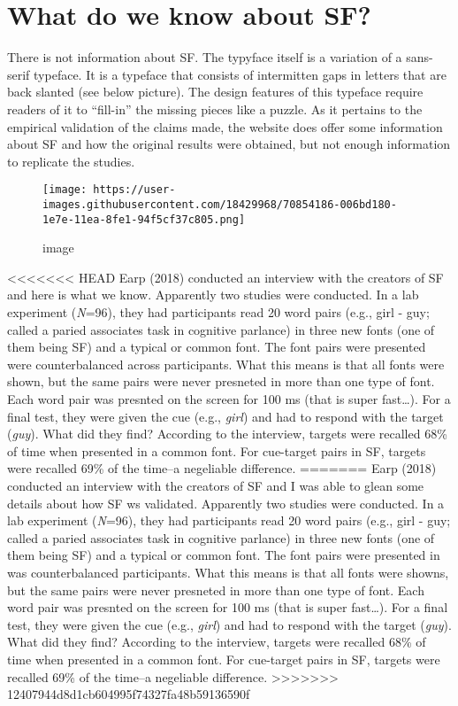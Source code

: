 \documentclass[]{article}
\begin{document}
\hypertarget{what-do-we-know-about-sf}{%
\section{What do we know about SF?}\label{what-do-we-know-about-sf}}

There is not information about SF. The typyface itself is a variation of
a sans-serif typeface. It is a typeface that consists of intermitten
gaps in letters that are back slanted (see below picture). The design
features of this typeface require readers of it to ``fill-in'' the
missing pieces like a puzzle. As it pertains to the empirical validation
of the claims made, the website does offer some information about SF and
how the original results were obtained, but not enough information to
replicate the studies.

\begin{figure}
\centering
\texttt{[image: https://user-images.githubusercontent.com/18429968/70854186-006bd180-1e7e-11ea-8fe1-94f5cf37c805.png]}
\caption{image}
\end{figure}

\textless{}\textless{}\textless{}\textless{}\textless{}\textless{}\textless{}
HEAD Earp (2018) conducted an interview with the creators of SF and here
is what we know. Apparently two studies were conducted. In a lab
experiment (\emph{N}=96), they had participants read 20 word pairs
(e.g., girl - guy; called a paried associates task in cognitive
parlance) in three new fonts (one of them being SF) and a typical or
common font. The font pairs were presented were counterbalanced across
participants. What this means is that all fonts were shown, but the same
pairs were never presneted in more than one type of font. Each word pair
was presnted on the screen for 100 ms (that is super fast\ldots{}). For
a final test, they were given the cue (e.g., \emph{girl}) and had to
respond with the target (\emph{guy}). What did they find? According to
the interview, targets were recalled 68\% of time when presented in a
common font. For cue-target pairs in SF, targets were recalled 69\% of
the time--a negeliable difference. ======= Earp (2018) conducted an
interview with the creators of SF and I was able to glean some details
about how SF ws validated. Apparently two studies were conducted. In a
lab experiment (\emph{N}=96), they had participants read 20 word pairs
(e.g., girl - guy; called a paried associates task in cognitive
parlance) in three new fonts (one of them being SF) and a typical or
common font. The font pairs were presented in was counterbalanced
participants. What this means is that all fonts were showns, but the
same pairs were never presneted in more than one type of font. Each word
pair was presnted on the screen for 100 ms (that is super fast\ldots{}).
For a final test, they were given the cue (e.g., \emph{girl}) and had to
respond with the target (\emph{guy}). What did they find? According to
the interview, targets were recalled 68\% of time when presented in a
common font. For cue-target pairs in SF, targets were recalled 69\% of
the time--a negeliable difference.
\textgreater{}\textgreater{}\textgreater{}\textgreater{}\textgreater{}\textgreater{}\textgreater{}
12407944d8d1cb604995f74327fa48b59136590f
\end{document}
